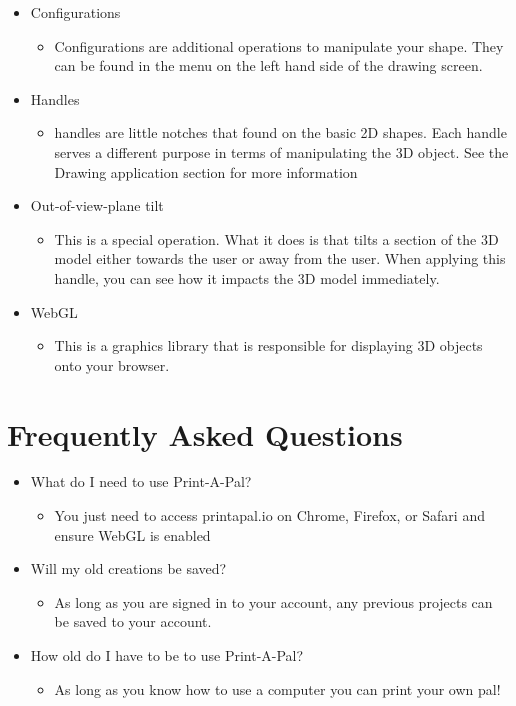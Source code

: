\documentclass{report}
\begin{document}
\begin{itemize}
	\item Configurations
    \begin{itemize}
    	\item Configurations are additional operations to manipulate your shape. They can be found in the menu on the left hand side of the drawing screen.
    \end{itemize}
    \item Handles
    \begin{itemize}
    	\item handles are little notches that found on the basic 2D shapes. Each handle serves a different purpose in terms of manipulating the 3D object. See the Drawing application section for more information 
    \end{itemize}
    \item Out-of-view-plane tilt
    \begin{itemize}
    	\item This is a special operation. What it does is that tilts a section of the 3D model either towards the user or away from the user. When applying this handle, you can see how it impacts the 3D model immediately.
    \end{itemize}
    \item WebGL
    \begin{itemize}
    	\item This is a graphics library that is responsible for displaying 3D objects onto your browser.
    \end{itemize}
\end{itemize}



\chapter{Frequently Asked Questions}
\begin{itemize}
	\item What do I need to use Print-A-Pal?
    \begin{itemize}
    	\item You just need to access printapal.io on Chrome, Firefox, or Safari and ensure WebGL is enabled
    \end{itemize}
    \item Will my old creations be saved?
    \begin{itemize}
    	\item As long as you are signed in to your account, any previous projects can be saved to your account.
    \end{itemize}
    \item How old do I have to be to use Print-A-Pal?
    \begin{itemize}
    	\item As long as you know how to use a computer you can print your own pal!	
    \end{itemize}
\end{itemize}
\end{document}
